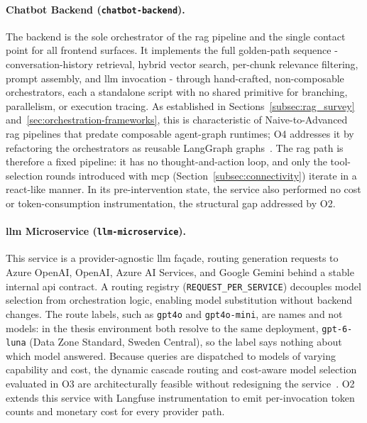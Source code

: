 \paragraph{Chatbot Backend (\texttt{chatbot-backend}).}
The backend is the sole orchestrator of the \gls{rag} pipeline and the single contact
point for all frontend surfaces.
It implements the full golden-path sequence - conversation-history retrieval,
hybrid vector search, per-chunk relevance filtering, prompt assembly, and \gls{llm}
invocation - through hand-crafted, non-composable orchestrators, each a
standalone script with no shared primitive for branching, parallelism, or
execution tracing.
As established in Sections~\ref{subsec:rag_survey}
and~\ref{sec:orchestration-frameworks}, this is characteristic of
Naive-to-Advanced \gls{rag} pipelines that predate composable agent-graph runtimes;
O4 addresses it by refactoring the orchestrators as reusable LangGraph
graphs~\cite{chase2022langchain}.
The \gls{rag} path is therefore a fixed pipeline: it has no thought-and-action
loop, and only the tool-selection rounds introduced with \gls{mcp} (Section~\ref{subsec:connectivity})
iterate in a \gls{react}-like manner.
In its pre-intervention state, the service also performed no cost or
token-consumption instrumentation, the structural gap addressed by O2.

\paragraph{\gls{llm} Microservice (\texttt{llm-microservice}).}
This service is a provider-agnostic \gls{llm} façade, routing generation requests to
Azure OpenAI, OpenAI, Azure AI Services, and Google Gemini behind a stable
internal \gls{api} contract.
A routing registry (\texttt{REQUEST\_PER\_SERVICE}) decouples model selection
from orchestration logic, enabling model substitution without backend changes.
The route labels, such as \texttt{gpt4o} and \texttt{gpt4o-mini}, are names
and not models: in the thesis environment both resolve to the same deployment,
\texttt{gpt-6-luna} (Data Zone Standard, Sweden Central), so the label says
nothing about which model answered.
Because queries are dispatched to models of varying capability and cost, the
dynamic cascade routing and cost-aware model selection evaluated in O3 are
architecturally feasible without redesigning the
service~\cite{chen2023frugalgpt}.
O2 extends this service with Langfuse instrumentation to emit per-invocation
token counts and monetary cost for every provider path.


